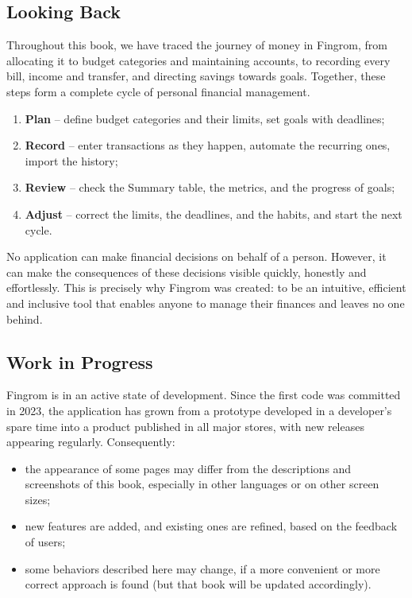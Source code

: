 
\subsection{Looking Back}

Throughout this book, we have traced the journey of money in Fingrom, from allocating it to
budget categories and maintaining accounts, to recording every bill, income and transfer, and
directing savings towards goals. Together, these steps form a complete cycle of personal
financial management.

\begin{enumerate}
  \item \textbf{Plan} -- define budget categories and their limits, set goals with deadlines;
  \item \textbf{Record} -- enter transactions as they happen, automate the recurring ones,
  import the history;
  \item \textbf{Review} -- check the Summary table, the metrics, and the progress of goals;
  \item \textbf{Adjust} -- correct the limits, the deadlines, and the habits, and start the
  next cycle.
\end{enumerate}

\noindent No application can make financial decisions on behalf of a person. However, it can
make the consequences of these decisions visible quickly, honestly and effortlessly. This is
precisely why Fingrom was created: to be an intuitive, efficient and inclusive tool that
enables anyone to manage their finances and leaves no one behind.


\subsection{Work in Progress}

Fingrom is in an active state of development. Since the first code was committed in 2023, the
application has grown from a prototype developed in a developer's spare time into a product
published in all major stores, with new releases appearing regularly. Consequently:

\begin{itemize}
  \item the appearance of some pages may differ from the descriptions and screenshots of this
  book, especially in other languages or on other screen sizes;
  \item new features are added, and existing ones are refined, based on the feedback of users;
  \item some behaviors described here may change, if a more convenient or more correct
  approach is found (but that book will be updated accordingly).
\end{itemize}

